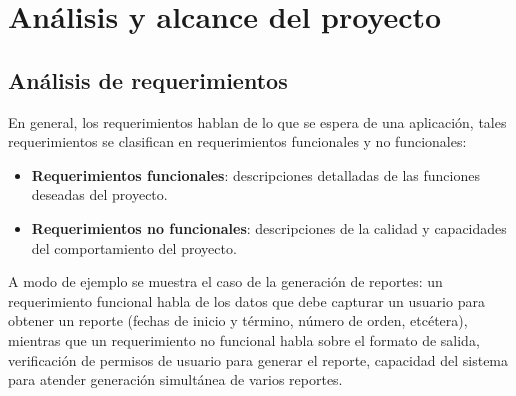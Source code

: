 \chapter{Análisis y alcance del proyecto}

\section{Análisis de requerimientos}
En general, los requerimientos hablan de lo que se espera de una aplicación, tales requerimientos se clasifican en requerimientos funcionales y no funcionales:
\begin{itemize}
\item \textbf{Requerimientos funcionales}: descripciones detalladas de las funciones deseadas del proyecto. \cite{WileyBegSE}
\item \textbf{Requerimientos no funcionales}: descripciones de la calidad y capacidades del comportamiento del proyecto. \cite{WileyBegSE}
\end{itemize}
A modo de ejemplo se muestra el caso de la generación de reportes: un requerimiento funcional habla de los datos que debe capturar un usuario para obtener un reporte (fechas de inicio y término, número de orden, etcétera), mientras que un requerimiento no funcional habla sobre el formato de salida, verificación de permisos de usuario para generar el reporte,  capacidad del sistema para atender generación simultánea de varios reportes.


